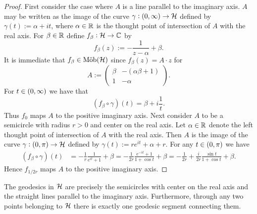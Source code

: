 \begin{proof}
	First consider the case where $A$ is a line parallel to the imaginary axis. $A$ may be written as the image of the curve $\gamma : \intoo{0,\infty} \to \Hcal$ defined by $\gamma(t) := \alpha + it$, where $\alpha \in \mathbb{R}$ is the thought point of intersection of $A$ with the real axis. For $\beta \in \mathbb{R}$ define $f_\beta : \mathcal{H} \to \mathbb{C}$ by
	\begin{equation}
		f_\beta(z) := -\frac{1}{z - \alpha} + \beta. 	
	\end{equation}
	It is immediate that $f_\beta \in \mathrm{M\ddot{o}b}(\mathcal{H})$ since $f_\beta(z) = A \cdot z$ for 
	\begin{equation*}
		A := \begin{pmatrix}
			\beta & - (\alpha\beta + 1)\\
			1 & -\alpha
		\end{pmatrix}.
	\end{equation*}
	For $t \in \intoo{0,\infty}$ we have that
	\begin{equation*}
		(f_\beta \circ \gamma)(t) = \beta + i\frac{1}{t}.
	\end{equation*}
	Thus $f_0$ maps $A$ to the positive imaginary axis. Next consider $A$ to be a semicircle with radius $r > 0$ and center on the real axis. Let $\alpha \in \mathbb{R}$ denote the left thought point of intersection of $A$ with the real axis. Then $A$ is the image of the curve $\gamma : \intoo{0,\pi} \to \Hcal$ defined by $\gamma(t) := re^{it} + \alpha + r$. For any $t \in \intoo{0,\pi}$ we have 
	\begin{align*}
		(f_\beta \circ \gamma)(t) &= -\frac{1}{r}\frac{1}{e^{it} + 1} + \beta = -\frac{1}{2r}\frac{e^{-it} + 1}{1 + \cos t} + \beta = -\frac{1}{2r} + \frac{i}{2r} \frac{\sin t}{1 + \cos t} + \beta.
	\end{align*}
	Hence $f_{1/2r}$ maps $A$ to the positive imaginary axis.
\end{proof}

\begin{theorem}
	The geodesics in $\mathcal{H}$ are precisely the semicircles with center on the real axis and the straight lines parallel to the imaginary axis. Furthermore, through any two points belonging to $\mathcal{H}$ there is exactly one geodesic segment connecting them. 
	\label{thm:geodesics}
\end{theorem}

